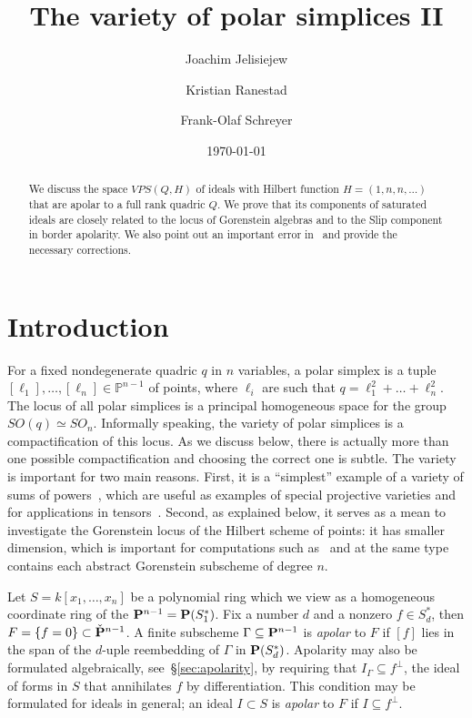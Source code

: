 \documentclass{amsart}
\title{The variety of polar simplices II}
\author[Joachim Jelisiejew]{Joachim Jelisiejew}
\author[Kristian Ranestad]{Kristian Ranestad}
\author[Frank-Olaf Schreyer]{Frank-Olaf Schreyer}
\date{\today{}}
\newcommand{\PP}{{\bf P}}
\newcommand{\kk}{k}
\begin{document}
\begin{abstract}
    We discuss the space $VPS(Q,H)$ of ideals with Hilbert function
    $H=(1,n,n, \ldots )$ that are apolar to a full rank quadric $Q$.
    We prove that its components of saturated ideals are closely related to the locus of
    Gorenstein algebras and to the Slip component in border apolarity. We also
    point out an important error in~\cite{RS} and provide the necessary
    corrections.
\end{abstract}

\maketitle%

\section{Introduction}

For a fixed nondegenerate quadric $q$ in $n$ variables, a polar simplex is a
tuple $[\ell_1], \ldots ,[\ell_n]\in \mathbb{P}^{n-1}$ of points, where
$\ell_i$ are such that $q = \ell_1^2 + \ldots + \ell_n^2$. The locus of all
polar simplices is a principal homogeneous space for the group $SO(q) \simeq SO_n$.
Informally speaking, the variety of polar simplices is a compactification of
this locus. As we discuss below, there is actually more than one possible compactification and
choosing the correct one is subtle. The variety is important for two
main reasons. First, it is a ``simplest'' example of a variety of sums of
powers~\cite{ranestad_schreyer_VSP}, which are useful as examples of special
projective varieties and for applications in tensors~\cite{Huang_Michalek_Ventura,
Gallet_Ranestad_Villamizar, Bolognesi_Massarenti, Ranestad_Voisin, Carlina_Catalisano_Oneto,
BB}. Second, as explained below, it serves as a mean to investigate the
Gorenstein locus of the Hilbert scheme of points: it has smaller dimension,
which is important for computations such as~\cite{Ilten} and at the same type
contains each abstract Gorenstein subscheme of degree $n$.

Let $S = \kk[x_1,  \ldots , x_n]$ be a polynomial ring which we view as a
homogeneous coordinate ring of the $\PP^{n-1}=\PP(S_1^{*})$. Fix a number $d$ and a nonzero  $f\in
S_d^{*}$, then $F=\{f=0\}\subset \check{\PP}^{n-1}$. A finite subscheme $\Gamma\subseteq \PP^{n-1}$ is \emph{apolar}
to $F$ if $[f]$ lies in the span of the $d$-uple reembedding of $\Gamma$ in $\PP(S_d^{*})$. Apolarity
may also be formulated algebraically, see~\S\ref{sec:apolarity}, by requiring
that $I_{\Gamma} \subseteq f^{\perp}$, the ideal of forms in $S$ that annihilates $f$ by differentiation.
This condition may be formulated for ideals in general; an ideal $I\subset S$ is {\em apolar} to $F$ if $I \subseteq f^{\perp}$.
\end{document}
